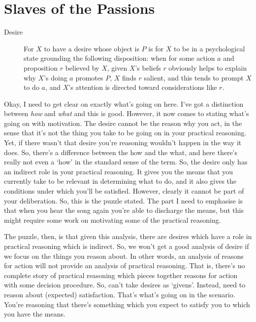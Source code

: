 \documentclass[10pt]{article}
\begin{document}
\section{Slaves of the Passions}
\label{sec:slaves-passions}

\begin{description}
\item[Desire]
For \(X\) to have a desire whose object is \(P\) is for \(X\) to be in a psychological state grounding the following disposition: when for some action \(a\) and proposition \(r\) believed by \(X\), given \(X\)'s beliefs \(r\) obviously helps to explain why \(X\)'s doing \(a\) promotes \(P\), \(X\) finds \(r\) salient, and this tends to prompt \(X\) to do \(a\), and \(X\)'s attention is directed toward considerations like \(r\).
\end{description}

{\color{red}
  Okay, I need to get clear on exactly what's going on here.
  I've got a distinction between \emph{how} and \emph{what} and this is good.
  However, it now comes to stating what's going on with motivation.
  The desire cannot be the reason why you act, in the sense that it's not the thing you take to be going on in your practical reasoning.
  Yet, if there wasn't that desire you're reasoning wouldn't happen in the way it does.
  So, there's a difference between the how and the what, and here there's really not even a `how' in the standard sense of the term.
  So, the desire only has an indirect role in your practical reasoning.
  It gives you the means that you currently take to be relevant in determining what to do, and it also gives the conditions under which you'll be satisfied.
  However, clearly it cannot be part of your deliberation.
  So, this is the puzzle stated.
  The part I need to emphasise is that when you hear the song again you're able to discharge the means, but this might require some work on motivating some of the practical reasoning.
}

{\color{blue}
  The puzzle, then, is that given this analysis, there are desires which have a role in practical reasoning which is indirect.
  So, we won't get a good analysis of desire if we focus on the things you reason about.
  In other words, an analysis of reasons for action will not provide an analysis of practical reasoning.
  That is, there's no complete story of practical reasoning which pieces together reasons for action with some decision procedure.
  So, can't take desires as `givens'.
  Instead, need to reason about (expected) satisfaction.
  That's what's going on in the scenario.
  You're reasoning that there's something which you expect to satisfy you to which you have the means.
}
\end{document}
